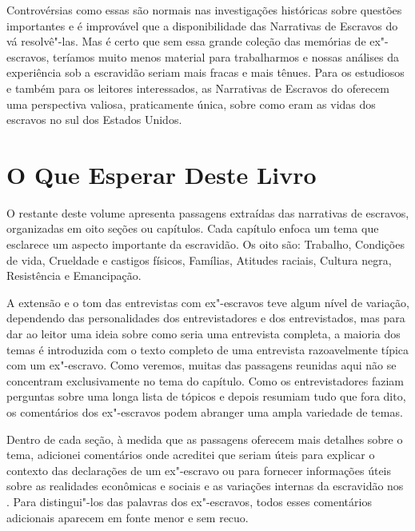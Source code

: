 Controvérsias como essas são normais nas investigações históricas sobre
questões importantes e é improvável que a disponibilidade das Narrativas
de Escravos do  vá resolvê"-las. Mas é certo que sem essa grande
coleção das memórias de ex"-escravos, teríamos muito menos material para
trabalharmos e nossas análises da experiência sob a escravidão seriam
mais fracas e mais tênues. Para os estudiosos e também para os leitores
interessados, as Narrativas de Escravos do  oferecem uma perspectiva
valiosa, praticamente única, sobre como eram as vidas dos escravos no
sul dos Estados Unidos.

\section{O Que Esperar Deste Livro}

O restante deste volume apresenta passagens extraídas das narrativas de
escravos, organizadas em oito seções ou capítulos. Cada capítulo enfoca
um tema que esclarece um aspecto importante da escravidão. Os oito são:
Trabalho, Condições de vida, Crueldade e castigos físicos, Famílias,
Atitudes raciais, Cultura negra, Resistência e Emancipação.

A extensão e o tom das entrevistas com ex"-escravos teve algum nível de
variação, dependendo das personalidades dos entrevistadores e dos
entrevistados, mas para dar ao leitor uma ideia sobre como seria uma
entrevista completa, a maioria dos temas é introduzida com o texto
completo de uma entrevista razoavelmente típica com um ex"-escravo. Como
veremos, muitas das passagens reunidas aqui não se concentram
exclusivamente no tema do capítulo. Como os entrevistadores faziam
perguntas sobre uma longa lista de tópicos e depois resumiam tudo que
fora dito, os comentários dos ex"-escravos podem abranger uma ampla
variedade de temas.

Dentro de cada seção, à medida que as passagens oferecem mais detalhes
sobre o tema, adicionei comentários onde acreditei que seriam úteis para
explicar o contexto das declarações de um ex"-escravo ou para fornecer
informações úteis sobre as realidades econômicas e sociais e as
variações internas da escravidão nos . Para distingui"-los das
palavras dos ex"-escravos, todos esses comentários adicionais aparecem em
fonte menor e sem recuo.